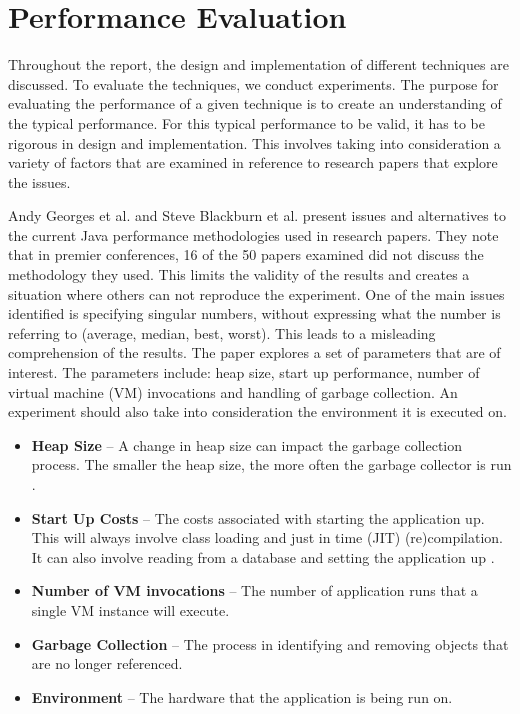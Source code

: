 \section{Performance Evaluation}
\label{performanceEvalBG}
Throughout the report, the design and implementation of different techniques are discussed. To evaluate the techniques, we conduct experiments. The purpose for evaluating the performance of a given technique is to create an understanding of the typical performance. For this typical performance to be valid, it has to be rigorous in design and implementation. This involves taking into consideration a variety of factors that are examined in reference to research papers that explore the issues.

Andy Georges et al. \cite{georges2007statistically} and Steve Blackburn et al. \cite{blackburn2008wake} present issues and alternatives to the current Java performance methodologies used in research papers. They note that in premier conferences, 16 of the 50 papers examined did not discuss the methodology they used. This limits the validity of the results and creates a situation where others can not reproduce the experiment. One of the main issues identified is specifying singular numbers, without expressing what the number is referring to (average, median, best, worst). This leads to a misleading comprehension of the results. The paper explores a set of parameters that are of interest. The parameters include: heap size, start up performance, number of virtual machine (VM) invocations and handling of garbage collection. An experiment should also take into consideration the environment it is executed on.
\begin{itemize}
\item \textbf{Heap Size} -- A change in heap size can impact the garbage collection process. The smaller the heap size, the more often the garbage collector is run \cite{blackburn2008wake}.
\item \textbf{Start Up Costs} -- The costs associated with starting the application up. This will always involve class loading and just in time (JIT) (re)compilation. It can also involve reading from a database and setting the application up \cite{blackburn2008wake}.
\item \textbf{Number of VM invocations} -- The number of application runs that a single VM instance will execute.
\item \textbf{Garbage Collection} -- The process in identifying and removing objects that are no longer referenced.
\item \textbf{Environment} -- The hardware that the application is being run on.
\end{itemize}

